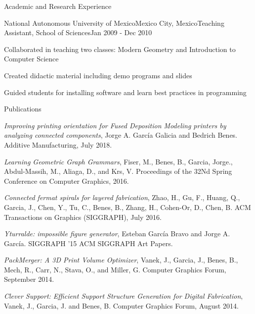 \documentclass{resume} %
\begin{document}
\begin{rSection}{Academic and Research Experience}
	\begin{rSubsection}{National Autonomous University of Mexico}{Mexico City, Mexico}{Teaching Assistant, School of Sciences}{Jan 2009 - Dec 2010}
	\item Collaborated in teaching two classes: Modern Geometry and Introduction to Computer Science
	\item Created didactic material including demo programs and slides
	\item Guided students for installing software and learn best practices in programming
	\end{rSubsection}

\end{rSection}

\begin{rSection}{Publications} \itemsep -4pt
\item \textit{Improving printing orientation for Fused Deposition Modeling printers by analyzing connected components}, Jorge A. García Galicia and Bedrich Benes. Additive Manufacturing, July 2018.
\item \textit{Learning Geometric Graph Grammars}, Fiser, M., Benes, B., Garcia, Jorge., Abdul-Massih, M., Aliaga, D., and Krs, V. Proceedings of the 32Nd Spring Conference on Computer Graphics, 2016.
\item \textit{Connected fermat spirals for layered fabrication}, Zhao, H., Gu, F., Huang, Q., Garcia, J., Chen, Y., Tu, C., Benes, B., Zhang, H., Cohen-Or, D., Chen, B. ACM Transactions on Graphics (SIGGRAPH), July 2016.
\item \textit{Yturralde: impossible figure generator}, Esteban Garc\'{i}a Bravo and Jorge A. Garc\'{i}a. SIGGRAPH '15 ACM SIGGRAPH Art Papers.
\item \textit{PackMerger: A 3D Print Volume Optimizer}, Vanek, J., Garcia, J., Benes, B., Mech, R., Carr, N., Stava, O., and Miller, G. Computer Graphics Forum, September 2014.
\item \textit{Clever Support: Efficient Support Structure Generation for Digital Fabrication}, Vanek, J., Garcia, J. and Benes, B. Computer Graphics Forum, August 2014.
\end{rSection}

\end{document}
